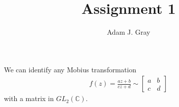 \documentclass{unswmaths}
\begin{document}
\author{Adam J. Gray}
\title{Assignment 1}
\subject{Complex Analysis}

\newcommand{\llra}{\Leftrightarrow}

\unswtitle

\section{}
\section{}
\section{}
\section{}
\section{}

We can identify any Mobius transformation 
\begin{align}
    f(z) = \frac{az + b}{cz + d} \sim \left[ \begin{array}{cc} a & b \\ c & d \end{array}\right]
\end{align}
with a matrix in $ GL_2(\mathbb{C}) $.
\end{document}
